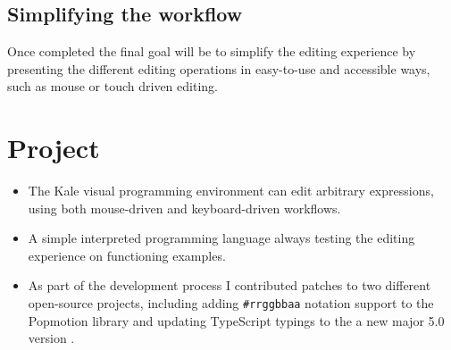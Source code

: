 \subsection{Simplifying the workflow}
Once completed the final goal will be to simplify the editing experience by
presenting the different editing operations in easy-to-use and accessible ways,
such as mouse or touch driven editing.

\section{Project}

\begin{itemize}
	\item The Kale visual programming environment can edit arbitrary expressions,
	using both mouse-driven and keyboard-driven workflows.
	
	\item A simple interpreted programming language always testing the editing
	experience on functioning examples.
	
	\item As part of the development process I contributed patches to two different
	open-source projects, including adding \texttt{\#rrggbbaa} notation support
	to the Popmotion library \citep{github-pr-popmotion} and updating
	 TypeScript typings to the a new major 5.0
	version \citep{github-pr-styled-components}.
\end{itemize}
